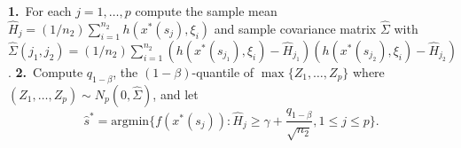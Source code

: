 \documentclass[mnsc,blindrev]{informs4} %
\begin{document}
\begin{algorithm}
\caption{$V$: Unnormalized Gaussian Supremum Validator}
\label{algo:supremum_unnormalized}
\begin{algorithmic}
\vspace{1ex}
\STATE \textbf{1.}~For each $j=1,\ldots,p$ compute the sample mean $\hat H_j=(1/n_2)\sum_{i=1}^{n_2}h(x^*(s_j),\xi_i)$ and sample covariance matrix $\hat \Sigma$ with $\hat \Sigma(j_1,j_2) = (1/n_2)\sum_{i=1}^{n_2}(h(x^*(s_{j_1}),\xi_i)-\hat H_{j_1})(h(x^*(s_{j_2}),\xi_i)-\hat H_{j_2})$.
\STATE \textbf{2.}~Compute $q_{1-\beta}$, the $(1-\beta)$-quantile of $\max\{Z_1,\ldots,Z_p\}$ where $(Z_1,\ldots,Z_p)\sim N_p(0,\hat \Sigma)$, and let
\begin{equation}\label{validate:gs unnormalized}
    \hat s^* = \text{argmin}\Bigg\{f(x^*(s_j)):\hat H_j\geq \gamma + \frac{ q_{1-\beta}}{\sqrt{n_2}}, 1\leq j\leq p\Bigg\}.
\end{equation}
\end{algorithmic}
\end{algorithm}



\end{document}
